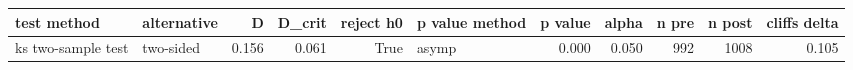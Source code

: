\begin{tabular}{llrrrlrrrrr}
\toprule
test method & alternative & D & D\_crit & reject h0 & p value method & p value & alpha & n pre & n post & cliffs delta \\
\midrule
ks two-sample test & two-sided & 0.156 & 0.061 & True & asymp & 0.000 & 0.050 & 992 & 1008 & 0.105 \\
\bottomrule
\end{tabular}
